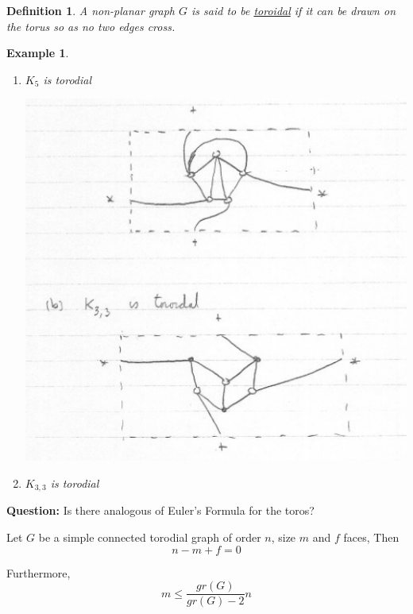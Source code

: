 \documentclass[12pt]{article}
\newenvironment{theorem}[1]{%
  \renewcommand\themanualtheoreminner{#1}%
  \manualtheoreminner
}{\endmanualtheoreminner}
\newtheorem{example}{Example}
\newtheorem{definition}{Definition}
\begin{document}
\begin{definition}
	A non-planar graph $G$ is said to be \underline{toroidal} if it can be drawn on the torus so as no two edges cross.
\end{definition}


\begin{example}
	\begin{enumerate}
		\item $K_{5}$ is torodial

		      \begin{center}
			      \includegraphics[scale=0.5]{torodial}
		      \end{center}

		\item $K_{3,3}$ is torodial

	\end{enumerate}

\end{example}


\textbf{Question:} Is there analogous of Euler's Formula for the toros?


\begin{theorem}{7}
	Let $G$ be a simple connected torodial graph of order $n$, size $m$ and $f$ faces, Then
	\[n - m + f = 0\]

	Furthermore,
	\[m \le \frac{gr(G)}{gr(G) - 2} n\]
\end{theorem}
\end{document}
